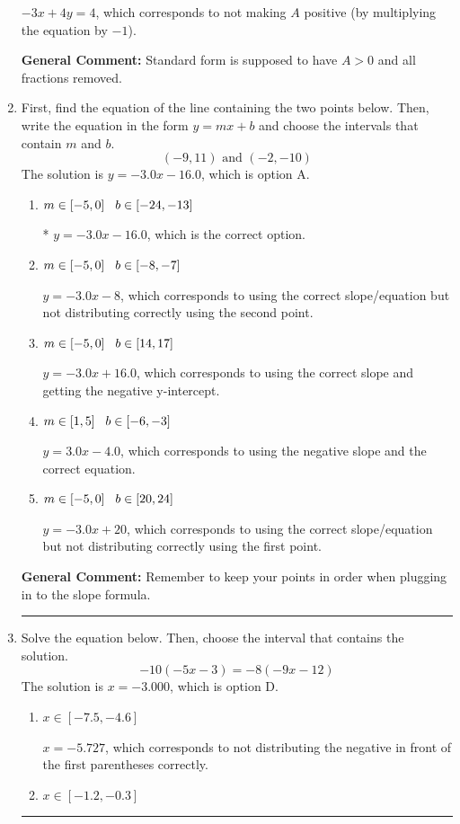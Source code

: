 \documentclass{extbook}[14pt]
\newcommand{\litem}[1]{\item #1

\rule{\textwidth}{0.4pt}}
\begin{document}
\begin{enumerate}
{\begin{enumerate}[label=\Alph*.]
 $-3x + 4y = 4$, which corresponds to not making $A$ positive (by multiplying the equation by $-1$).
\end{enumerate}

\textbf{General Comment:} Standard form is supposed to have $A > 0$ and all fractions removed.
}
\litem{
First, find the equation of the line containing the two points below. Then, write the equation in the form $ y=mx+b $ and choose the intervals that contain $m$ and $b$.
\[ (-9, 11) \text{ and } (-2, -10) \]The solution is \( y = -3.0x -16.0 \), which is option A.\begin{enumerate}[label=\Alph*.]
\item \( m \in [-5, 0] \hspace*{3mm} b \in [-24, -13] \)

* $y = -3.0x -16.0$, which is the correct option.
\item \( m \in [-5, 0] \hspace*{3mm} b \in [-8, -7] \)

 $y = -3.0x -8$, which corresponds to using the correct slope/equation but not distributing correctly using the second point.
\item \( m \in [-5, 0] \hspace*{3mm} b \in [14, 17] \)

 $y = -3.0x + 16.0$, which corresponds to using the correct slope and getting the negative y-intercept.
\item \( m \in [1, 5] \hspace*{3mm} b \in [-6, -3] \)

 $y = 3.0x -4.0$, which corresponds to using the negative slope and the correct equation.
\item \( m \in [-5, 0] \hspace*{3mm} b \in [20, 24] \)

 $y = -3.0x + 20$, which corresponds to using the correct slope/equation but not distributing correctly using the first point.
\end{enumerate}

\textbf{General Comment:} Remember to keep your points in order when plugging in to the slope formula.
}
\litem{
Solve the equation below. Then, choose the interval that contains the solution.
\[ -10(-5x -3) = -8(-9x -12) \]The solution is \( x = -3.000 \), which is option D.\begin{enumerate}[label=\Alph*.]
\item \( x \in [-7.5, -4.6] \)

$x = -5.727$, which corresponds to not distributing the negative in front of the first parentheses correctly.
\item \( x \in [-1.2, -0.3] \)


\end{enumerate}}
\end{enumerate}
\end{document}
